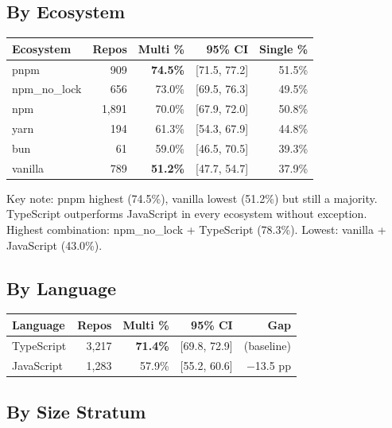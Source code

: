 \documentclass[12pt,a4paper]{article}
\begin{document}
\subsection{By Ecosystem}

\begin{table}[h]
\centering
\begin{tabular}{@{}lrrrr@{}}
\toprule
Ecosystem & Repos & Multi \% & 95\% CI & Single \% \\
\midrule
pnpm          &   909 & \textbf{74.5\%} & [71.5, 77.2] & 51.5\% \\
npm\_no\_lock &   656 & 73.0\%          & [69.5, 76.3] & 49.5\% \\
npm           & 1,891 & 70.0\%          & [67.9, 72.0] & 50.8\% \\
yarn          &   194 & 61.3\%          & [54.3, 67.9] & 44.8\% \\
bun           &    61 & 59.0\%          & [46.5, 70.5] & 39.3\% \\
vanilla       &   789 & \textbf{51.2\%} & [47.7, 54.7] & 37.9\% \\
\bottomrule
\end{tabular}
\end{table}

Key note: pnpm highest (74.5\%), vanilla lowest (51.2\%) but still a majority. TypeScript outperforms JavaScript in every ecosystem without exception. Highest combination: npm\_no\_lock + TypeScript (78.3\%). Lowest: vanilla + JavaScript (43.0\%).

\subsection{By Language}

\begin{table}[h]
\centering
\begin{tabular}{@{}lrrrr@{}}
\toprule
Language & Repos & Multi \% & 95\% CI & Gap \\
\midrule
TypeScript  & 3,217 & \textbf{71.4\%} & [69.8, 72.9] & (baseline) \\
JavaScript  & 1,283 & 57.9\%          & [55.2, 60.6] & $-$13.5 pp \\
\bottomrule
\end{tabular}
\end{table}

\subsection{By Size Stratum}
\end{document}
